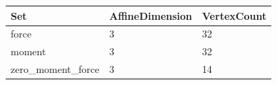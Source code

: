 \begin{tabular}{@{}lll@{}}
\toprule
Set & AffineDimension & VertexCount \\
\midrule
force & 3 & 32 \\
moment & 3 & 32 \\
zero\_moment\_force & 3 & 14 \\
\bottomrule
\end{tabular}
